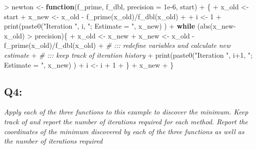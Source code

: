 \documentclass[
]{article}
\newenvironment{Shaded}{\begin{snugshade}}{\end{snugshade}}
\newcommand{\AttributeTok}[1]{\textcolor[rgb]{0.77,0.63,0.00}{#1}}
\newcommand{\CommentTok}[1]{\textcolor[rgb]{0.56,0.35,0.01}{\textit{#1}}}
\newcommand{\ControlFlowTok}[1]{\textcolor[rgb]{0.13,0.29,0.53}{\textbf{#1}}}
\newcommand{\DecValTok}[1]{\textcolor[rgb]{0.00,0.00,0.81}{#1}}
\newcommand{\FloatTok}[1]{\textcolor[rgb]{0.00,0.00,0.81}{#1}}
\newcommand{\FunctionTok}[1]{\textcolor[rgb]{0.00,0.00,0.00}{#1}}
\newcommand{\NormalTok}[1]{#1}
\newcommand{\OtherTok}[1]{\textcolor[rgb]{0.56,0.35,0.01}{#1}}
\newcommand{\SpecialCharTok}[1]{\textcolor[rgb]{0.00,0.00,0.00}{#1}}
\newcommand{\StringTok}[1]{\textcolor[rgb]{0.31,0.60,0.02}{#1}}
\begin{document}
\begin{Shaded}
\begin{Highlighting}[]
\SpecialCharTok{\textgreater{}}\NormalTok{ newton }\OtherTok{\textless{}{-}} \ControlFlowTok{function}\NormalTok{(f\_prime, f\_dbl, }\AttributeTok{precision =} \FloatTok{1e{-}6}\NormalTok{, start)}
\SpecialCharTok{+}\NormalTok{ \{}
\SpecialCharTok{+}\NormalTok{   x\_old }\OtherTok{\textless{}{-}}\NormalTok{ start}
\SpecialCharTok{+}\NormalTok{   x\_new }\OtherTok{\textless{}{-}}\NormalTok{ x\_old }\SpecialCharTok{{-}} \FunctionTok{f\_prime}\NormalTok{(x\_old)}\SpecialCharTok{/}\FunctionTok{f\_dbl}\NormalTok{(x\_old)}
\SpecialCharTok{+}   
\SpecialCharTok{+}\NormalTok{   i }\OtherTok{\textless{}{-}} \DecValTok{1}
\SpecialCharTok{+}   \FunctionTok{print}\NormalTok{(}\FunctionTok{paste0}\NormalTok{(}\StringTok{"Iteration "}\NormalTok{, i, }\StringTok{"; Estimate = "}\NormalTok{, x\_new) )}
\SpecialCharTok{+}   \ControlFlowTok{while}\NormalTok{ (}\FunctionTok{abs}\NormalTok{(x\_new}\SpecialCharTok{{-}}\NormalTok{x\_old) }\SpecialCharTok{\textgreater{}}\NormalTok{ precision)\{}
\SpecialCharTok{+}\NormalTok{     x\_old }\OtherTok{\textless{}{-}}\NormalTok{ x\_new}
\SpecialCharTok{+}\NormalTok{     x\_new }\OtherTok{\textless{}{-}}\NormalTok{ x\_old }\SpecialCharTok{{-}} \FunctionTok{f\_prime}\NormalTok{(x\_old)}\SpecialCharTok{/}\FunctionTok{f\_dbl}\NormalTok{(x\_old)}
\SpecialCharTok{+}     \CommentTok{\# ::: redefine variables and calculate new estimate}
\SpecialCharTok{+}     \CommentTok{\# ::: keep track of iteration history}
\SpecialCharTok{+}     \FunctionTok{print}\NormalTok{(}\FunctionTok{paste0}\NormalTok{(}\StringTok{"Iteration "}\NormalTok{, i}\SpecialCharTok{+}\DecValTok{1}\NormalTok{, }\StringTok{"; Estimate = "}\NormalTok{, x\_new) )}
\SpecialCharTok{+}\NormalTok{     i }\OtherTok{\textless{}{-}}\NormalTok{ i }\SpecialCharTok{+} \DecValTok{1}
\SpecialCharTok{+}\NormalTok{   \}}
\SpecialCharTok{+}\NormalTok{   x\_new}
\SpecialCharTok{+}\NormalTok{ \}}
\end{Highlighting}
\end{Shaded}

\hypertarget{q4}{%
\subsection{Q4:}\label{q4}}

\emph{Apply each of the three functions to this example to discover the
minimum. Keep track of and report the number of iterations required for
each method. Report the coordinates of the minimum discovered by each of
the three functions as well as the number of iterations required}
\end{document}
